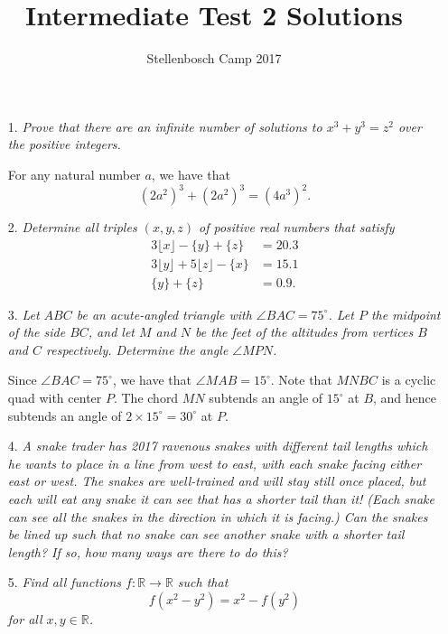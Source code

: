 \documentclass[12pt]{article}
\title{Intermediate Test 2 Solutions}
\author{Stellenbosch Camp 2017}
\begin{document}
 \maketitle

\begin{enumerate}

\item[1.] \emph{Prove that there are an infinite number of solutions to $x^3 + y^3 = z^2$ over the positive integers.}

For any natural number $a$, we have that
\[
    (2a^2)^3 + (2a^2)^3 = (4a^3)^2.
\]

\item[2.] \emph{Determine all triples $(x,y,z)$ of positive real numbers that satisfy
\begin{align*}
	3\lfloor{x}\rfloor -\{y\} +\{z\} &= 20.3 \\
	3\lfloor{y}\rfloor +5\lfloor{z}\rfloor -\{x\} &= 15.1 \\
	\{y\} +\{z\} &= 0.9.
\end{align*}
}



\item[3.] \emph{Let $ABC$ be an acute-angled triangle with $\angle BAC = 75^\circ$. Let $P$ the midpoint of the side $BC$, and let $M$ and $N$ be the feet of the altitudes from vertices $B$ and $C$ respectively. Determine the angle $\angle MPN$.}

Since $\angle BAC = 75^\circ$, we have that $\angle MAB = 15^\circ$. Note that
$MNBC$ is a cyclic quad with center $P$. The chord $MN$ subtends an angle of
$15^\circ$ at $B$, and hence subtends an angle of $2 \times 15^\circ = 30^\circ$
at $P$.

\item[4.] \emph{A snake trader has 2017 ravenous snakes with different tail lengths which he wants to place in a line from west to east, with each snake facing either east or west. The snakes are well-trained and will stay still once placed, but each will eat any snake it can see that has a shorter tail than it! (Each snake can see all the snakes in the direction in which it is facing.) Can the snakes be lined up such that no snake can see another snake with a shorter tail length? If so, how many ways are there to do this?}



\item[5.] \emph{Find all functions $f : \mathbb{R} \to \mathbb{R}$ such that
	\[f(x^2-y^2) = x^2 - f(y^2)\]
for all $x,y \in \mathbb{R}$.}



\end{enumerate}
\end{document}
